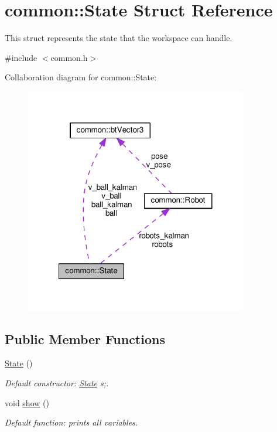 \hypertarget{structcommon_1_1State}{\section{common\-:\-:State Struct Reference}
\label{structcommon_1_1State}
}


This struct represents the state that the workspace can handle.  




{\ttfamily \#include $<$common.\-h$>$}



Collaboration diagram for common\-:\-:State\-:
\nopagebreak
\begin{figure}[H]
\begin{center}
\leavevmode
\includegraphics[width=275pt]{structcommon_1_1State__coll__graph}
\end{center}
\end{figure}
\subsection*{Public Member Functions}
\begin{DoxyCompactItemize}
\item 
\hypertarget{structcommon_1_1State_ac8dcfb15646bb310c85161de2900c8c6}{\hyperlink{structcommon_1_1State_ac8dcfb15646bb310c85161de2900c8c6}{State} ()}\label{structcommon_1_1State_ac8dcfb15646bb310c85161de2900c8c6}

\begin{DoxyCompactList}\small\item\em Default constructor\-: \hyperlink{structcommon_1_1State}{State} s;. \end{DoxyCompactList}\item 
\hypertarget{structcommon_1_1State_af0a474961bf0f3afe274ce27da0f28a3}{void \hyperlink{structcommon_1_1State_af0a474961bf0f3afe274ce27da0f28a3}{show} ()}\label{structcommon_1_1State_af0a474961bf0f3afe274ce27da0f28a3}

\begin{DoxyCompactList}\small\item\em Default function\-: prints all variables. \end{DoxyCompactList}\end{DoxyCompactItemize}
